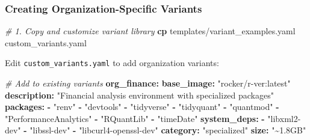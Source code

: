 \documentclass[
]{article}
\newenvironment{Shaded}{\begin{snugshade}}{\end{snugshade}}
\newcommand{\AttributeTok}[1]{\textcolor[rgb]{0.13,0.29,0.53}{#1}}
\newcommand{\CommentTok}[1]{\textcolor[rgb]{0.56,0.35,0.01}{\textit{#1}}}
\newcommand{\FunctionTok}[1]{\textcolor[rgb]{0.13,0.29,0.53}{\textbf{#1}}}
\newcommand{\KeywordTok}[1]{\textcolor[rgb]{0.13,0.29,0.53}{\textbf{#1}}}
\newcommand{\NormalTok}[1]{#1}
\newcommand{\StringTok}[1]{\textcolor[rgb]{0.31,0.60,0.02}{#1}}
\begin{document}
\subsubsection{Creating Organization-Specific
Variants}\label{creating-organization-specific-variants}

\begin{Shaded}
\begin{Highlighting}[]
\CommentTok{\# 1. Copy and customize variant library}
\FunctionTok{cp}\NormalTok{ templates/variant\_examples.yaml custom\_variants.yaml}
\end{Highlighting}
\end{Shaded}

Edit \texttt{custom\_variants.yaml} to add organization variants:

\begin{Shaded}
\begin{Highlighting}[]
\CommentTok{\# Add to existing variants}
\FunctionTok{org\_finance}\KeywordTok{:}
\AttributeTok{  }\FunctionTok{base\_image}\KeywordTok{:}\AttributeTok{ }\StringTok{"rocker/r{-}ver:latest"}
\AttributeTok{  }\FunctionTok{description}\KeywordTok{:}\AttributeTok{ }\StringTok{"Financial analysis environment with specialized packages"}
\AttributeTok{  }\FunctionTok{packages}\KeywordTok{:}
\AttributeTok{    }\KeywordTok{{-}}\AttributeTok{ }\StringTok{"renv"}
\AttributeTok{    }\KeywordTok{{-}}\AttributeTok{ }\StringTok{"devtools"}
\AttributeTok{    }\KeywordTok{{-}}\AttributeTok{ }\StringTok{"tidyverse"}
\AttributeTok{    }\KeywordTok{{-}}\AttributeTok{ }\StringTok{"tidyquant"}
\AttributeTok{    }\KeywordTok{{-}}\AttributeTok{ }\StringTok{"quantmod"}
\AttributeTok{    }\KeywordTok{{-}}\AttributeTok{ }\StringTok{"PerformanceAnalytics"}
\AttributeTok{    }\KeywordTok{{-}}\AttributeTok{ }\StringTok{"RQuantLib"}
\AttributeTok{    }\KeywordTok{{-}}\AttributeTok{ }\StringTok{"timeDate"}
\AttributeTok{  }\FunctionTok{system\_deps}\KeywordTok{:}
\AttributeTok{    }\KeywordTok{{-}}\AttributeTok{ }\StringTok{"libxml2{-}dev"}
\AttributeTok{    }\KeywordTok{{-}}\AttributeTok{ }\StringTok{"libssl{-}dev"}
\AttributeTok{    }\KeywordTok{{-}}\AttributeTok{ }\StringTok{"libcurl4{-}openssl{-}dev"}
\AttributeTok{  }\FunctionTok{category}\KeywordTok{:}\AttributeTok{ }\StringTok{"specialized"}
\AttributeTok{  }\FunctionTok{size}\KeywordTok{:}\AttributeTok{ }\StringTok{"\textasciitilde{}1.8GB"}


\end{Highlighting}
\end{Shaded}
\end{document}
